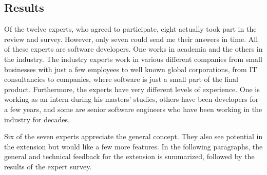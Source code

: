 \subsection{Results}
\label{ssec:ch5:ss2.2}
Of the twelve experts, who agreed to participate, eight actually took part in the review and survey.
However, only seven could send me their answers in time.
All of these experts are software developers.
One works in academia and the others in the industry.
The industry experts work in various different companies from small businesses with just a few employees to well known global corporations,
from IT consultancies to companies, where software is just a small part of the final product.
Furthermore, the experts have very different levels of experience.
One is working as an intern during his masters' studies, others have been developers for a few years, and some are senior software engineers who have been working in the industry for decades.

Six of the seven experts appreciate the general concept.
They also see potential in the extension but would like a few more features.
In the following paragraphs, the general and technical feedback for the extension is summarized, followed by the results of the expert survey.

